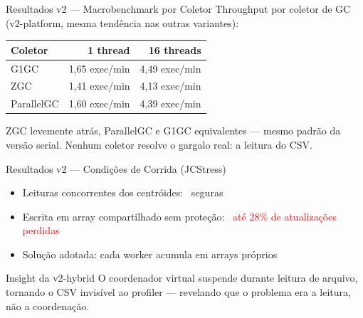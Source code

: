 \begin{frame}{Resultados v2 --- Macrobenchmark por Coletor}
    Throughput por coletor de GC (v2-platform, mesma tendência nas outras variantes):

    \vspace{0.6em}
    \begin{center}
    \begin{tabular}{lrr}
        \toprule
        \textbf{Coletor} & \textbf{1 thread} & \textbf{16 threads} \\
        \midrule
        G1GC       & 1,65 exec/min & 4,49 exec/min \\
        ZGC        & 1,41 exec/min & 4,13 exec/min \\
        ParallelGC & 1,60 exec/min & 4,39 exec/min \\
        \bottomrule
    \end{tabular}
    \end{center}

    \vspace{0.6em}
    ZGC levemente atrás, ParallelGC e G1GC equivalentes --- \alert{mesmo padrão da versão serial}.
    Nenhum coletor resolve o gargalo real: a leitura do CSV.
\end{frame}

\begin{frame}{Resultados v2 --- Condições de Corrida (JCStress)}
    \begin{itemize}
        \item Leituras concorrentes dos centróides: \textcolor{green!60!black}{\cmark\ seguras}
        \item Escrita em array compartilhado sem proteção: \textcolor{red}{\xmark\ até 28\% de atualizações perdidas}
        \item Solução adotada: cada worker acumula em arrays próprios
    \end{itemize}

    \vspace{1em}
    \begin{block}{Insight da v2-hybrid}
        O coordenador virtual suspende durante leitura de arquivo, tornando o CSV
        invisível ao profiler --- revelando que o problema era a leitura, não a coordenação.
    \end{block}
\end{frame}
